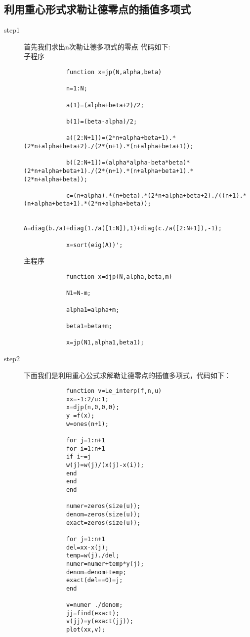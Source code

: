 \documentclass{article}
\begin{document}
	\subsection {利用重心形式求勒让德零点的插值多项式}
	\begin{description}
		\item[step1] 首先我们求出n次勒让德多项式的零点
		代码如下:\\
		子程序
		\begin{lstlisting}
			function x=jp(N,alpha,beta)
			
			n=1:N;
			
			a(1)=(alpha+beta+2)/2;
			
			b(1)=(beta-alpha)/2;
			
			a([2:N+1])=(2*n+alpha+beta+1).*(2*n+alpha+beta+2)./(2*(n+1).*(n+alpha+beta+1));
			
			b([2:N+1])=(alpha*alpha-beta*beta)*(2*n+alpha+beta+1)./(2*(n+1).*(n+alpha+beta+1).*(2*n+alpha+beta));
			
			c=(n+alpha).*(n+beta).*(2*n+alpha+beta+2)./((n+1).*(n+alpha+beta+1).*(2*n+alpha+beta));
			
			A=diag(b./a)+diag(1./a([1:N]),1)+diag(c./a([2:N+1]),-1);
			
			x=sort(eig(A))';
		\end{lstlisting}
		主程序
		\begin{lstlisting}
			function x=djp(N,alpha,beta,m)
			
			N1=N-m;
			
			alpha1=alpha+m;
			
			beta1=beta+m;
			
			x=jp(N1,alpha1,beta1);
		\end{lstlisting}
		\item[step2] 下面我们是利用重心公式求解勒让德零点的插值多项式，代码如下：
		\begin{lstlisting}
			function v=Le_interp(f,n,u)
			xx=-1:2/u:1;
			x=djp(n,0,0,0);
			y =f(x);
			w=ones(n+1);
			
			for j=1:n+1
			for i=1:n+1
			if i~=j
			w(j)=w(j)/(x(j)-x(i));
			end
			end
			end
			
			numer=zeros(size(u));
			denom=zeros(size(u));
			exact=zeros(size(u));
			
			for j=1:n+1
			del=xx-x(j);
			temp=w(j)./del;
			numer=numer+temp*y(j);
			denom=denom+temp;
			exact(del==0)=j;
			end
			
			v=numer ./denom;
			jj=find(exact);
			v(jj)=y(exact(jj));
			plot(xx,v);
		\end{lstlisting}
	\end{description}
\end{document}
